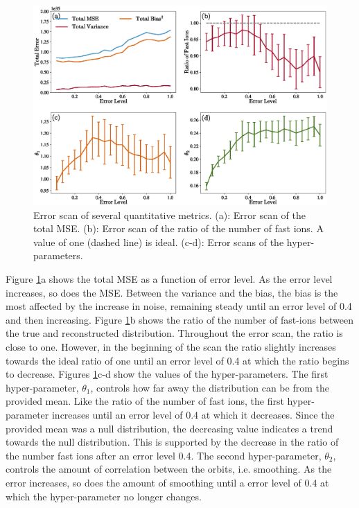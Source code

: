 \begin{figure}[h!]
    \centering
    \includegraphics[width=14cm]{figures/error_scan.eps}
    \caption{Error scan of several quantitative metrics. (a): Error scan of the total MSE. (b): Error scan of the ratio of the number of fast ions. A value of one (dashed line) is ideal. (c-d): Error scans of the hyper-parameters.}
    \label{fig:error_scan}
\end{figure}
Figure \ref{fig:error_scan}a shows the total MSE as a function of error level. As the error level increases, so does the MSE. Between the variance and the bias, the bias is the most affected by the increase in noise, remaining steady until an error level of 0.4 and then increasing. Figure \ref{fig:error_scan}b shows the ratio of the number of fast-ions between the true and reconstructed distribution. Throughout the error scan, the ratio is close to one. However, in the beginning of the scan the ratio slightly increases towards the ideal ratio of one until an error level of 0.4 at which the ratio begins to decrease. Figures \ref{fig:error_scan}c-d show the values of the hyper-parameters. The first hyper-parameter, $\theta_1$, controls how far away the distribution can be from the provided mean.  Like the ratio of the number of fast ions, the first hyper-parameter increases until an error level of 0.4 at which it decreases. Since the provided mean was a null distribution, the decreasing value indicates a trend towards the null distribution. This is supported by the decrease in the ratio of the number fast ions after an error level 0.4. The second hyper-parameter, $\theta_2$, controls the amount of correlation between the orbits, i.e. smoothing. As the error increases, so does the amount of smoothing until a error level of 0.4 at which the hyper-parameter no longer changes.

